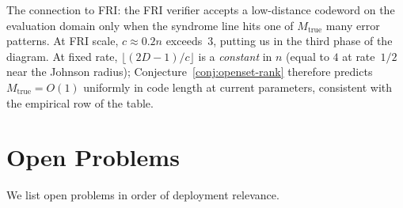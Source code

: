 \documentclass[11pt]{article}
\begin{document}
The connection to FRI: the FRI verifier accepts a low-distance codeword on the evaluation domain only when the syndrome line hits one of $M_{\mathrm{true}}$ many error patterns. At FRI scale, $c \approx 0.2n$ exceeds~$3$, putting us in the third phase of the diagram. At fixed rate, $\lfloor (2D - 1)/c\rfloor$ is a \emph{constant} in $n$ (equal to $4$ at rate~$1/2$ near the Johnson radius); Conjecture~\ref{conj:openset-rank} therefore predicts $M_{\mathrm{true}} = O(1)$ uniformly in code length at current parameters, consistent with the empirical row of the table.


\section{Open Problems}
\label{sec:open}

We list open problems in order of deployment relevance.
\end{document}
